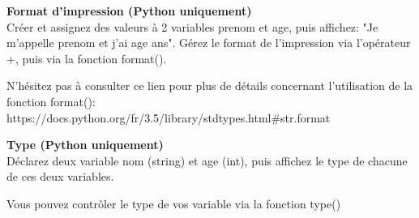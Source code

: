 \begin{Exercice}[20 minutes] \textbf{Format d'impression (Python uniquement)}\\
   Créer et assignez des valeurs à 2 variables prenom et age, puis affichez: "Je m'appelle prenom et j'ai age ans". Gérez le format de l'impression via l'opérateur +, puis via la fonction format(). \\
   
    \begin{conseil}
       N'hésitez pas à consulter ce lien pour plus de détails concernant l'utilisation de la fonction format(): \\
        https://docs.python.org/fr/3.5/library/stdtypes.html\#str.format 
        
    \end{conseil}
    \begin{solution}
     
    
           
    \end{solution}   
\end{Exercice}

\begin{Exercice}[20 minutes] \textbf{Type (Python uniquement)}\\
   Déclarez deux variable nom (string) et age (int), puis affichez le type de chacune de ces deux variables. \\
   
    \begin{conseil}
       Vous pouvez contrôler le type de vos variable via la fonction type()
        
    \end{conseil}
    \begin{solution}
     
    
           
    \end{solution}   
\end{Exercice}

